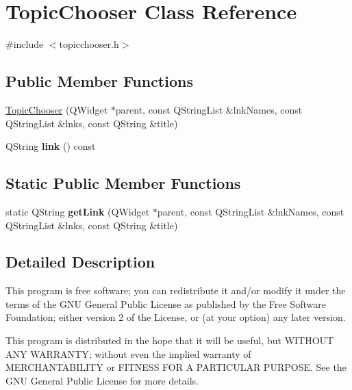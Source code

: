 \hypertarget{classTopicChooser}{
\section{TopicChooser Class Reference}
\label{classTopicChooser}
}


{\ttfamily \#include $<$topicchooser.h$>$}

\subsection*{Public Member Functions}
\begin{DoxyCompactItemize}
\item 
\hyperlink{classTopicChooser_a5745e54e9e9f9898ce103d3351fc9785}{TopicChooser} (QWidget $\ast$parent, const QStringList \&lnkNames, const QStringList \&lnks, const QString \&title)
\item 
\hypertarget{classTopicChooser_aaaf1d7e6b63e1130271975456224cca6}{
QString {\bfseries link} () const }
\label{classTopicChooser_aaaf1d7e6b63e1130271975456224cca6}

\end{DoxyCompactItemize}
\subsection*{Static Public Member Functions}
\begin{DoxyCompactItemize}
\item 
\hypertarget{classTopicChooser_a2a7f79d9152ac761ac5d9af9576af23e}{
static QString {\bfseries getLink} (QWidget $\ast$parent, const QStringList \&lnkNames, const QStringList \&lnks, const QString \&title)}
\label{classTopicChooser_a2a7f79d9152ac761ac5d9af9576af23e}

\end{DoxyCompactItemize}


\subsection{Detailed Description}
This program is free software; you can redistribute it and/or modify it under the terms of the GNU General Public License as published by the Free Software Foundation; either version 2 of the License, or (at your option) any later version.

This program is distributed in the hope that it will be useful, but WITHOUT ANY WARRANTY; without even the implied warranty of MERCHANTABILITY or FITNESS FOR A PARTICULAR PURPOSE. See the GNU General Public License for more details.


